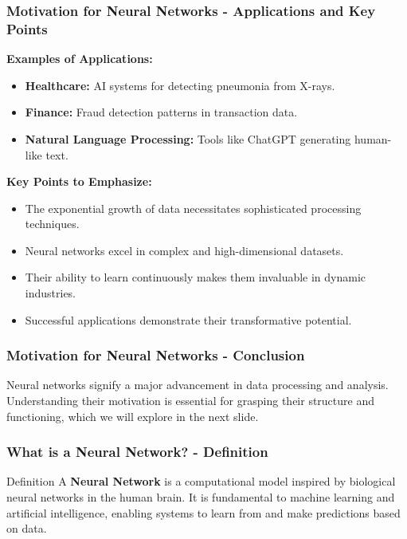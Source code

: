 \documentclass[aspectratio=169]{beamer}
\begin{document}
\begin{frame}[fragile]
    \frametitle{Motivation for Neural Networks - Applications and Key Points}
    \textbf{Examples of Applications:}
    \begin{itemize}
        \item \textbf{Healthcare:} AI systems for detecting pneumonia from X-rays.
        \item \textbf{Finance:} Fraud detection patterns in transaction data.
        \item \textbf{Natural Language Processing:} Tools like ChatGPT generating human-like text.
    \end{itemize}

    \textbf{Key Points to Emphasize:}
    \begin{itemize}
        \item The exponential growth of data necessitates sophisticated processing techniques.
        \item Neural networks excel in complex and high-dimensional datasets.
        \item Their ability to learn continuously makes them invaluable in dynamic industries.
        \item Successful applications demonstrate their transformative potential.
    \end{itemize}
\end{frame}

\begin{frame}[fragile]
    \frametitle{Motivation for Neural Networks - Conclusion}
    Neural networks signify a major advancement in data processing and analysis. Understanding their motivation is essential for grasping their structure and functioning, which we will explore in the next slide.
\end{frame}

\begin{frame}[fragile]
    \frametitle{What is a Neural Network? - Definition}
    \begin{block}{Definition}
        A \textbf{Neural Network} is a computational model inspired by biological neural networks in the human brain. It is fundamental to machine learning and artificial intelligence, enabling systems to learn from and make predictions based on data.
    \end{block}
\end{frame}
\end{document}
